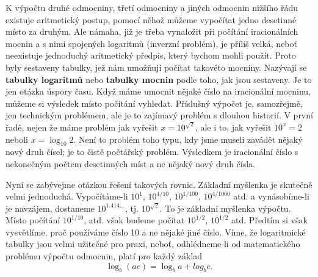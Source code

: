     K výpočtu druhé odmocniny, třetí odmocniny a jiných odmocnin nižšího řádu existuje aritmetický
    postup, pomocí něhož můžeme vypočítat jedno desetinné místo za druhým. Ale námaha, již je třeba
    vynaložit při počítání iracionálních mocnin a s nimi spojených logaritmů (inverzní problém), je
    příliš velká, neboť neexistuje jednoduchý aritmetický předpis, který bychom mohli použít. Proto
    byly sestaveny tabulky, jež nám umožňují počítat takovéto mocniny. Nazývají se \textbf{tabulky
    logaritmů} nebo \textbf{tabulky mocnin} podle toho, jak jsou sestaveny. Je to jen otázka úspory
    času. Když máme umocnit nějaké číslo na iracionální mocninu, můžeme si výsledek místo počítání
    vyhledat. Příslušný výpočet je, samozřejmě, jen technickým problémem, ale je to zajímavý problém
    s dlouhou historií. V první řadě, nejen že máme problém jak vyřešit \(x=10^{\sqrt{2}}\), ale i
    to, jak vyřešit \(10^x=2\) neboli \(x= \log_{10}2\). Není to problém toho typu, kdy jsme museli
    zavádět nějaký nový druh čísel; je to čistě počtářský problém. Výsledkem je iracionální číslo s
    nekonečným počtem desetinných míst a ne nějaký nový druh čísla.

    Nyní se zabývejme otázkou řešení takových rovnic. Základní myšlenka je skutečně velmi
    jednoduchá. Vypočítáme-li \(10^1\), \(10^{4/10}\), \(10^{1/100}\), \(10^{4/1000}\) atd. a
    vynásobíme-li je navzájem, dostaneme \(10^{1.414\ldots}\), tj. \(10^{\sqrt{2}}\). To je
    základní myšlenka výpočtu. Místo počítání \(10^{1/10}\), atd. však budeme počítat \(10^{1/2}\),
    \(10^{1/2}\) atd. Předtím si však vysvětlíme, proč používáme číslo \num{10} a ne nějaké jiné
    číslo. Víme, že logaritmické tabulky jsou velmi užitečné pro praxi, neboť, odhlédneme-li od
    matematického problému výpočtu odmocnin, platí pro každý základ
    \begin{equation}\label{fyz:eq693}
      \log_b(ac)=\log_ba+log_bc.
    \end{equation}
  
